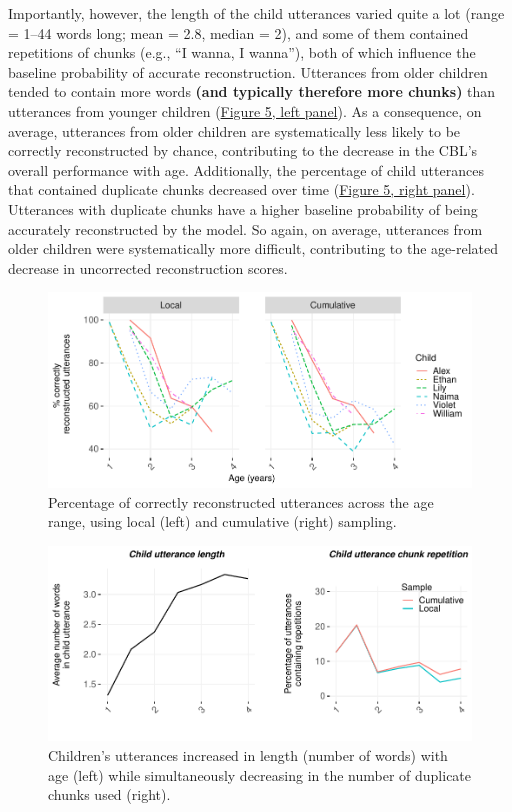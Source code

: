 \documentclass[
  english,
  man,mask,floatsintext]{apa6}
\begin{document}
Importantly, however, the length of the child utterances varied quite a lot (range = 1--44 words long; mean = 2.8, median = 2), and some of them contained repetitions of chunks (e.g., \enquote{I wanna, I wanna}), both of which influence the baseline probability of accurate reconstruction. Utterances from older children tended to contain more words \textbf{(and typically therefore more chunks)} than utterances from younger children (\protect\hyperlink{fig5}{Figure 5, left panel}). As a consequence, on average, utterances from older children are systematically less likely to be correctly reconstructed by chance, contributing to the decrease in the CBL's overall performance with age. Additionally, the percentage of child utterances that contained duplicate chunks decreased over time (\protect\hyperlink{fig5}{Figure 5, right panel}). Utterances with duplicate chunks have a higher baseline probability of being accurately reconstructed by the model. So again, on average, utterances from older children were systematically more difficult, contributing to the age-related decrease in uncorrected reconstruction scores.

\begin{figure}
\includegraphics[width=0.95\linewidth]{CBL-age_invariance_files/figure-latex/fig4-1} \caption{Percentage of correctly reconstructed utterances across the age range, using local (left) and cumulative (right) sampling.}\label{fig:fig4}
\end{figure}

\begin{figure}
\includegraphics[width=0.95\linewidth]{CBL-age_invariance_files/figure-latex/fig5-1} \caption{Children's utterances increased in length (number of words) with age (left) while simultaneously decreasing in the number of duplicate chunks used (right).}\label{fig:fig5}
\end{figure}
\end{document}
